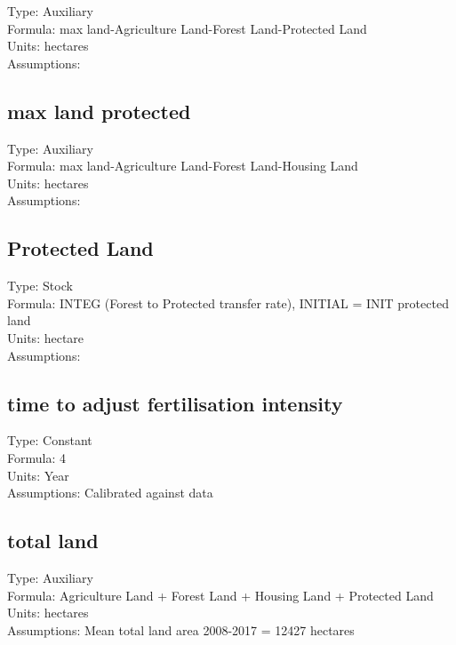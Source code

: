 \documentclass[
  11pt,
]{book}
\begin{document}
Type: Auxiliary\\
Formula: max land-Agriculture Land-Forest Land-Protected Land\\
Units: hectares\\
Assumptions:

\hypertarget{max-land-protected}{%
\subsection{max land protected}\label{max-land-protected}}

Type: Auxiliary\\
Formula: max land-Agriculture Land-Forest Land-Housing Land\\
Units: hectares\\
Assumptions:

\hypertarget{protected-land}{%
\subsection{Protected Land}\label{protected-land}}

Type: Stock\\
Formula: INTEG (Forest to Protected transfer rate), INITIAL = INIT protected land\\
Units: hectare\\
Assumptions:

\hypertarget{time-to-adjust-fertilisation-intensity}{%
\subsection{time to adjust fertilisation intensity}\label{time-to-adjust-fertilisation-intensity}}

Type: Constant\\
Formula: 4\\
Units: Year\\
Assumptions: Calibrated against data

\hypertarget{total-land}{%
\subsection{total land}\label{total-land}}

Type: Auxiliary\\
Formula: Agriculture Land + Forest Land + Housing Land + Protected Land\\
Units: hectares\\
Assumptions: Mean total land area 2008-2017 = 12427 hectares
\end{document}

